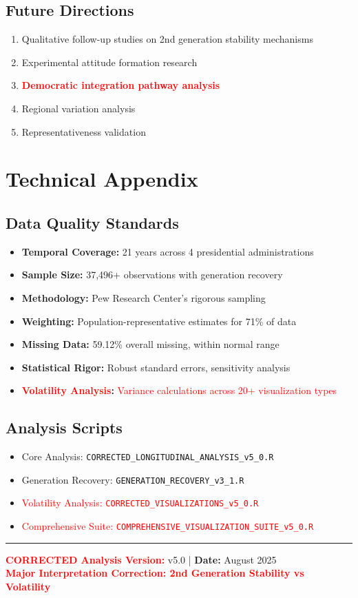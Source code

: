 \documentclass[11pt,letterpaper]{article}
\newcommand{\compactdesc}[2]{\item \textbf{#1:} #2}
\begin{document}
\subsection{Future Directions}
\begin{enumerate}
    \item Qualitative follow-up studies on 2nd generation stability mechanisms
    \item Experimental attitude formation research
    \item \textcolor{red}{\textbf{Democratic integration pathway analysis}}
    \item Regional variation analysis
    \item Representativeness validation
\end{enumerate}

\section{Technical Appendix}

\subsection{Data Quality Standards}
\begin{itemize}
    \compactdesc{Temporal Coverage}{21 years across 4 presidential administrations}
    \compactdesc{Sample Size}{37,496+ observations with generation recovery}
    \compactdesc{Methodology}{Pew Research Center's rigorous sampling}
    \compactdesc{Weighting}{Population-representative estimates for 71\% of data}
    \compactdesc{Missing Data}{59.12\% overall missing, within normal range}
    \compactdesc{Statistical Rigor}{Robust standard errors, sensitivity analysis}
    \compactdesc{\textcolor{red}{Volatility Analysis}}{\textcolor{red}{Variance calculations across 20+ visualization types}}
\end{itemize}

\subsection{Analysis Scripts}
\begin{itemize}
    \item Core Analysis: \texttt{CORRECTED\_LONGITUDINAL\_ANALYSIS\_v5\_0.R}
    \item Generation Recovery: \texttt{GENERATION\_RECOVERY\_v3\_1.R}
    \item \textcolor{red}{Volatility Analysis: \texttt{CORRECTED\_VISUALIZATIONS\_v5\_0.R}}
    \item \textcolor{red}{Comprehensive Suite: \texttt{COMPREHENSIVE\_VISUALIZATION\_SUITE\_v5\_0.R}}
\end{itemize}

\vspace{1em}
\noindent\rule{\textwidth}{0.2pt}

\begin{center}
\textbf{\textcolor{red}{CORRECTED Analysis Version:}} v5.0 | \textbf{Date:} August 2025\\
\textcolor{red}{\textbf{Major Interpretation Correction: 2nd Generation Stability vs Volatility}}
\end{center}
\end{document}
